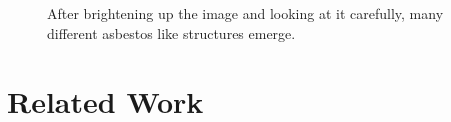 \begin{figure}[h]
\centering


\caption{After brightening up the image and looking at it carefully, many different asbestos like structures emerge.}
\label{fig:non-asbestos_examples}
\end{figure}

\section{Related Work}

